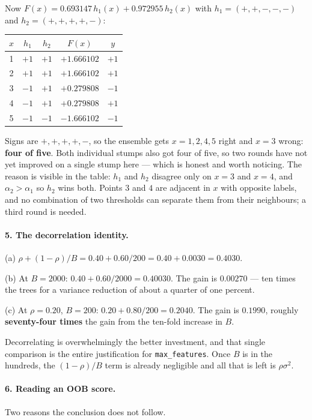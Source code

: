 \documentclass[11pt]{article}
\begin{document}
Now $F(x) = 0.693147\,h_1(x) + 0.972955\,h_2(x)$ with
$h_1 = (+,+,-,-,-)$ and $h_2 = (+,+,+,+,-)$:
\begin{center}
\begin{tabular}{ccccc}
  \toprule
  $x$ & $h_1$ & $h_2$ & $F(x)$ & $y$ \\
  \midrule
  1 & $+1$ & $+1$ & $+1.666102$ & $+1$ \\
  2 & $+1$ & $+1$ & $+1.666102$ & $+1$ \\
  3 & $-1$ & $+1$ & $+0.279808$ & $-1$ \\
  4 & $-1$ & $+1$ & $+0.279808$ & $+1$ \\
  5 & $-1$ & $-1$ & $-1.666102$ & $-1$ \\
  \bottomrule
\end{tabular}
\end{center}
Signs are $+,+,+,+,-$, so the ensemble gets $x = 1, 2, 4, 5$ right and $x = 3$
wrong: \textbf{four of five}. Both individual stumps also got four of five, so
two rounds have not yet improved on a single stump here --- which is honest and
worth noticing. The reason is visible in the table: $h_1$ and $h_2$ disagree
only on $x = 3$ and $x = 4$, and $\alpha_2 > \alpha_1$ so $h_2$ wins both.
Points $3$ and $4$ are adjacent in $x$ with opposite labels, and no combination
of two thresholds can separate them from their neighbours; a third round is
needed.

\paragraph{5. The decorrelation identity.}
(a) $\rho + (1-\rho)/B = 0.40 + 0.60/200 = 0.40 + 0.0030 = \mathbf{0.4030}$.

(b) At $B = 2000$: $0.40 + 0.60/2000 = 0.40030$. The gain is $0.00270$ --- ten
times the trees for a variance reduction of about a quarter of one percent.

(c) At $\rho = 0.20$, $B = 200$: $0.20 + 0.80/200 = \mathbf{0.2040}$. The gain
is $0.1990$, roughly \textbf{seventy-four times} the gain from the ten-fold
increase in $B$.

Decorrelating is overwhelmingly the better investment, and that single
comparison is the entire justification for \texttt{max\_features}. Once $B$ is
in the hundreds, the $(1-\rho)/B$ term is already negligible and all that is
left is $\rho\sigma^2$.

\paragraph{6. Reading an OOB score.}
Two reasons the conclusion does not follow.
\end{document}
